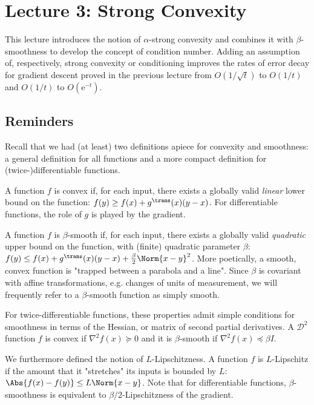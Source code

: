 \section{Lecture 3: Strong Convexity}

This lecture introduces the notion of
$\alpha$-strong convexity
and combines it with
$\beta$-smoothness to develop the concept of
condition number.
Adding an assumption of, respectively,
strong convexity or conditioning
improves the rates of error decay
for gradient descent proved
in the previous lecture from
$O(1/\sqrt{t})$ to $O(1/t)$ and
$O(1/t)$ to $O(\mathrm{e}^{-t})$.

\subsection{Reminders}

Recall that we had (at least)
two definitions apiece for
convexity and smoothness:
a general definition for all functions
and a more compact definition for (twice-)differentiable functions.

A function $f$ is convex
if, for each input, there exists a
globally valid \emph{linear} lower bound on the function:
$f(y) \geq f(x) + g^\trans(x)(y-x)$.
For differentiable functions,
the role of $g$ is played by the gradient.

A function $f$ is $\beta$-smooth
if, for each input, there exists a
globally valid \emph{quadratic} upper bound on the function,
with (finite) quadratic parameter $\beta$:
$f(y) \leq f(x) + g^\trans(x)(y-x) + \frac{\beta}{2}\Norm{x-y}^2$.
More poetically,
a smooth, convex function is
"trapped between a parabola and a line".
Since $\beta$ is covariant with affine transformations,
e.g. changes of units of measurement,
we will frequently refer to a $\beta$-smooth function as simply
smooth.

For twice-differentiable functions,
these properties admit simple conditions
for smoothness in terms of the Hessian,
or matrix of second partial derivatives.
A $\mathcal{D}^2$ function $f$ is convex if
$\nabla^2f(x) \succeq 0$
and it is $\beta$-smooth if
$\nabla^2f(x) \preceq \beta I$.

We furthermore defined the notion of $L$-Lipschitzness.
A function $f$ is $L$-Lipschitz if the amount that it
"stretches" its inputs is bounded by $L$:
$\Abs{f(x)-f(y)} \leq L\Norm{x-y}$.
Note that for differentiable functions,
$\beta$-smoothness is equivalent to
$\beta/2$-Lipschitzness of the gradient.

